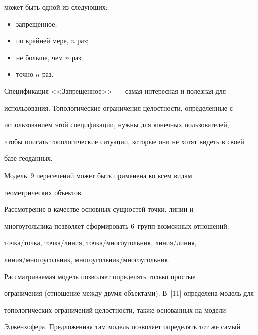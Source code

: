 может быть одной из следующих:


    \begin{itemize}


\item запрещенное; 


\item по крайней мере,  $n$  раз; 


\item не больше, чем  $n$  раз; 


\item точно  $n$  раз. 


    \end{itemize}


    


    Спецификация <<Запрещенное>>~--- самая интересная и полезная для 


использования. Топологические ограничения целостности, определенные с 


использованием этой спецификации, нужны для конечных пользователей, 


чтобы описать топологические ситуации, которые они не хотят видеть в своей 


базе геоданных. 


    


    Модель~9 пересечений может быть применена ко всем видам 


геометрических объектов. 


    


    Рассмотрение в качестве основных сущностей точки, линии и 


многоугольника позволяет сформировать 6~групп возможных отношений: 


точ\-ка/точ\-ка, точ\-ка/ли\-ния, точ\-ка/мно\-го\-уголь\-ник, ли\-ния/ли\-ния, 


ли\-ния/мно\-го\-уголь\-ник, многоугольник/многоугольник. 


    


    Рассматриваемая модель позволяет определять только простые 


ограничения (отношение между двумя объектами). В~[11] определена модель для 


топологических ограничений целостности, также основанных на модели 


Эдженхофера. Предложенная там модель позволяет определять тот же самый 


